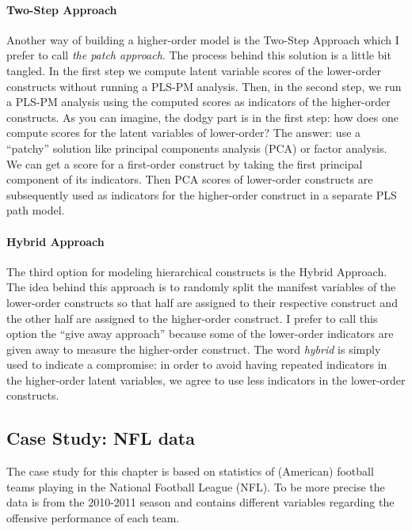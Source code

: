 \documentclass[12pt]{book}\usepackage{graphicx, color}
\begin{document}
\paragraph{Two-Step Approach}
Another way of building a higher-order model is the Two-Step Approach which I prefer to call \textit{the patch approach}. The process behind this solution is a little bit tangled. In the first step we compute latent variable scores of the lower-order constructs without running a PLS-PM analysis. Then, in the second step, we run a PLS-PM analysis using the computed scores as indicators of the higher-order constructs. As you can imagine, the dodgy part is in the first step: how does one compute scores for the latent variables of lower-order? The answer: use a ``patchy'' solution like principal components analysis (PCA) or factor analysis. We can get a score for a first-order construct by taking the first principal component of its indicators. Then PCA scores of lower-order constructs are subsequently used as indicators for the higher-order construct in a separate PLS path model.

\paragraph{Hybrid Approach}
The third option for modeling hierarchical constructs is the Hybrid Approach. The idea behind this approach is to randomly split the manifest variables of the lower-order constructs so that half are assigned to their respective construct and the other half are assigned to the higher-order construct. I prefer to call this option the ``give away approach'' because some of the lower-order indicators are given away to measure the higher-order construct. The word \textit{hybrid} is simply used to indicate a compromise: in order to avoid having repeated indicators in the higher-order latent variables, we agree to use less indicators in the lower-order constructs.



\subsection{Case Study: NFL data}
The case study for this chapter is based on statistics of (American) football teams playing in the National Football League (NFL). To be more precise the data is from the 2010-2011 season and contains different variables regarding the offensive performance of each team.
\end{document}
